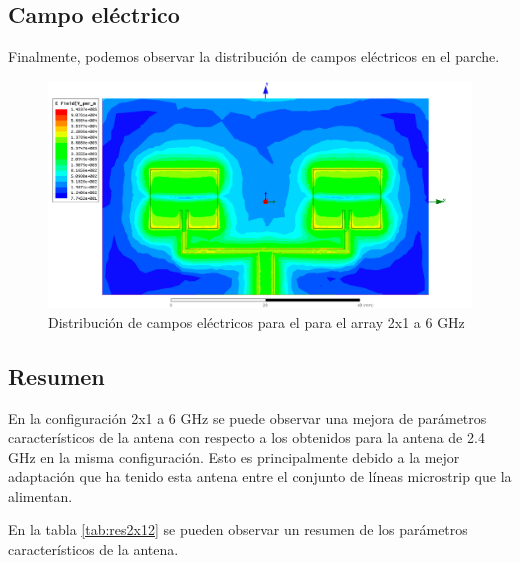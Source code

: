 \subsection{Campo eléctrico}
\par Finalmente, podemos observar la distribución de campos eléctricos en el parche. 

\begin{figure}[H]
    \centering
        \includegraphics[width=\textwidth]{archivos/analisis/2x12/8}
        \caption{Distribución de campos eléctricos para el para el array 2x1 a 6 GHz}
        \label{fig:elec2x12}
\end{figure}

\subsection{Resumen}
\par En la configuración 2x1 a 6 GHz se puede observar una mejora de parámetros característicos de la antena con respecto a los obtenidos para la antena de 2.4 GHz en la misma configuración. Esto es principalmente debido a la mejor adaptación que ha tenido esta antena entre el conjunto de líneas microstrip que la alimentan.
\\
\par En la tabla \ref{tab:res2x12} se pueden observar un resumen de los parámetros característicos de la antena.

